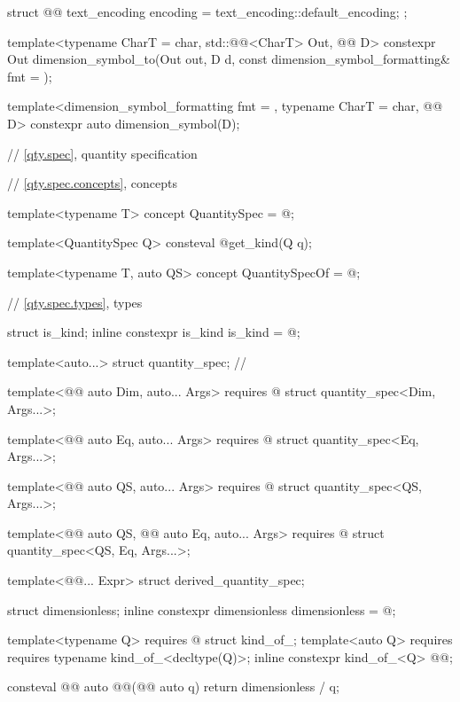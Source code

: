 \begin{codeblock}
{struct @@ {
  text_encoding encoding = text_encoding::default_encoding;
};

template<typename CharT = char, std::@@<CharT> Out, @@ D>
constexpr Out dimension_symbol_to(Out out, D d, const dimension_symbol_formatting& fmt = {});

template<dimension_symbol_formatting fmt = {}, typename CharT = char, @@ D>
constexpr auto dimension_symbol(D);

// \ref{qty.spec}, quantity specification

// \ref{qty.spec.concepts}, concepts

template<typename T>
concept QuantitySpec = @\seebelownc@;

template<QuantitySpec Q>
consteval @\seebelownc@ get_kind(Q q);

template<typename T, auto QS>
concept QuantitySpecOf = @\seebelownc@;

// \ref{qty.spec.types}, types

struct is_kind;
inline constexpr is_kind is_kind = @\seebelownc@;

template<auto...>
struct quantity_spec;  // \notdef

template<@@ auto Dim, auto... Args>
  requires @\seebelownc@
struct quantity_spec<Dim, Args...>;

template<@@ auto Eq, auto... Args>
  requires @\seebelownc@
struct quantity_spec<Eq, Args...>;

template<@@ auto QS, auto... Args>
  requires @\seebelownc@
struct quantity_spec<QS, Args...>;

template<@@ auto QS, @@ auto Eq, auto... Args>
  requires @\seebelownc@
struct quantity_spec<QS, Eq, Args...>;

template<@@... Expr>
struct derived_quantity_spec;

struct dimensionless;
inline constexpr dimensionless dimensionless = @\seebelownc@;

template<typename Q>
  requires @\seebelownc@
struct kind_of_;
template<auto Q>
  requires requires { typename kind_of_<decltype(Q)>; }
inline constexpr kind_of_<Q> @@{};

consteval @@ auto @@(@@ auto q) { return dimensionless / q; }

}
\end{codeblock}
